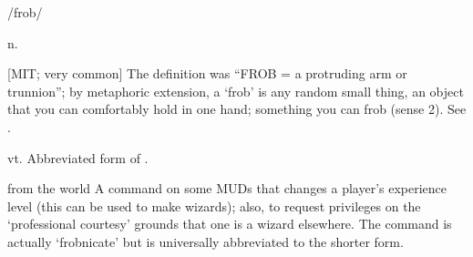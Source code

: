 /frob/

\begin{inparaenum}
	\item n.

		[MIT; very common] The  definition was ``FROB = a protruding arm or trunnion''; by metaphoric extension, a `frob'
		is any random small thing, an object that you can comfortably hold in one hand; something you can frob (sense 2). See
		.
	\item vt. Abbreviated form of .
	\item [from the \citeentry{MUD} world] A command on some MUDs that changes a player's experience level (this can be used to make
		wizards); also, to request  privileges on the `professional courtesy' grounds that one is a wizard elsewhere. The
		command is actually `frobnicate' but is universally abbreviated to the shorter form.
\end{inparaenum}

